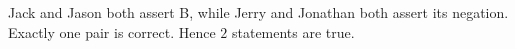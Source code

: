 Jack and Jason both assert B, while Jerry and Jonathan both assert its negation. Exactly one pair is correct. Hence $\boxed2 $ statements are true.
